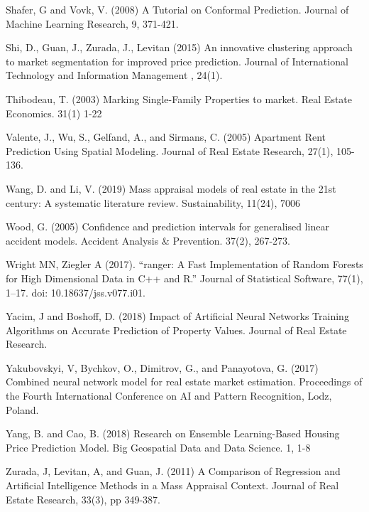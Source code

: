 \documentclass[colTwo]{anon}
\theoremstyle{definition}
\begin{document}
\begin{thebibliography}{50}
\harvarditem{}{}{}Shafer, G and Vovk, V. (2008) A Tutorial on Conformal Prediction. Journal of Machine Learning Research, 9, 371-421. 

\harvarditem{}{}{}Shi, D., Guan, J., Zurada, J., Levitan (2015) An innovative clustering approach to market segmentation for improved price prediction. Journal of International Technology and Information Management , 24(1).  

\harvarditem{}{}{}Thibodeau, T. (2003) Marking Single-Family Properties to market. Real Estate Economics. 31(1) 1-22

\harvarditem{}{}{}Valente, J., Wu, S., Gelfand, A., and Sirmans, C. (2005) Apartment Rent Prediction Using Spatial Modeling. Journal of Real Estate Research, 27(1), 105-136. 

\harvarditem{}{}{}Wang, D. and Li, V. (2019) Mass appraisal models of real estate in the 21st century: A systematic literature review.  Sustainability, 11(24), 7006

\harvarditem{}{}{}Wood, G. (2005) Confidence and prediction intervals for generalised linear accident models. Accident Analysis \& Prevention. 37(2), 267-273. 

\harvarditem{}{}{}Wright MN, Ziegler A (2017). “ranger: A Fast Implementation of Random Forests for High Dimensional Data in C++ and R.” Journal of Statistical Software, 77(1), 1–17. doi: 10.18637/jss.v077.i01.

\harvarditem{}{}{}Yacim, J and Boshoff, D. (2018) Impact of Artificial Neural Networks Training Algorithms on Accurate Prediction of Property Values. Journal of Real Estate Research. 

\harvarditem{}{}{}Yakubovskyi, V, Bychkov, O., Dimitrov, G., and Panayotova, G.  (2017) Combined neural network model for real estate market estimation. Proceedings of the Fourth International Conference on AI and Pattern Recognition, Lodz, Poland.  

\harvarditem{}{}{}Yang, B. and Cao, B. (2018) Research on Ensemble Learning-Based Housing Price Prediction Model. Big Geospatial Data and Data Science. 1, 1-8

\harvarditem{}{}{}Zurada, J, Levitan, A, and Guan, J. (2011) A Comparison of Regression and Artificial Intelligence Methods in a Mass Appraisal Context. Journal of Real Estate Research, 33(3), pp 349-387. 

\end{thebibliography}

\pagebreak
\pagebreak
\end{document}
